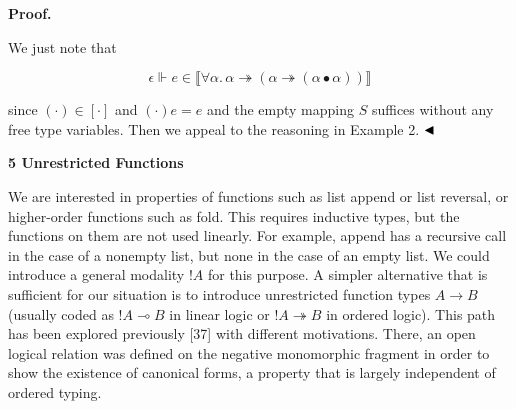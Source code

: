  
 
 
 
\par\medskip\noindent\textbf{Proof.}\par
 
 
We just note that\par
  
\par  \quad  \[\epsilon\Vdash e\in\llbracket\forall\alpha.\,\alpha\twoheadrightarrow(\alpha\twoheadrightarrow(\alpha\bullet\alpha))\rrbracket\]\quad  \quad  
  
since $(\cdot)\in[\cdot]$ and $(\cdot)e=e$ and the empty mapping $S$ suffices without any free type variables. Then we appeal to the reasoning in Example 2. $\hfill\blacktriangleleft$\par
 
 
 


 
\par\medskip\noindent\textbf{5 Unrestricted Functions}\par
 
 
We are interested in properties of functions such as list append or list reversal, or higher-order functions such as fold. This requires inductive types, but the functions on them are not used linearly. For example, append has a recursive call in the case of a nonempty list, but none in the case of an empty list. We could introduce a general modality ${!}A$ for this purpose. A simpler alternative that is sufficient for our situation is to introduce unrestricted function types $A\mathbin{\rightarrow}B$ (usually coded as ${!}A\multimap B$ in linear logic or ${!}A\twoheadrightarrow B$ in ordered logic). This path has been explored previously [37] with different motivations. There, an open logical relation was defined on the negative monomorphic fragment in order to show the existence of canonical forms, a property that is largely independent of ordered typing.\par
 
 
